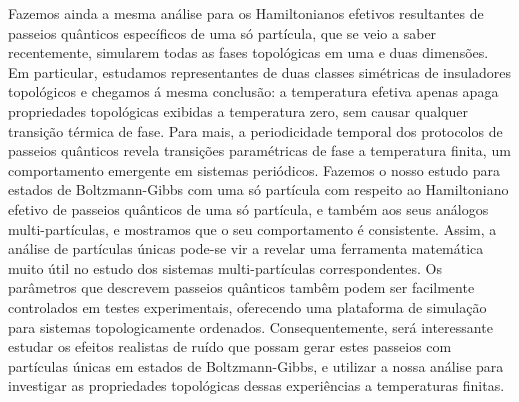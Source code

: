 \documentclass[11pt]{report}
\begin{document}
Fazemos ainda a mesma an\'{a}lise para os Hamiltonianos efetivos resultantes de passeios qu\^{a}nticos espec\'{i}ficos de uma s\'{o} part\'{i}cula, que se veio a saber recentemente, simularem todas as fases topol\'{o}gicas em uma e duas dimens\~{o}es. Em particular, estudamos representantes de duas classes sim\'{e}tricas de insuladores topol\'{o}gicos e chegamos \'{a} mesma conclus\~{a}o: a temperatura efetiva apenas apaga propriedades topol\'{o}gicas exibidas a temperatura zero, sem causar qualquer transi\c{c}\~{a}o t\'{e}rmica de fase. Para mais, a periodicidade temporal dos protocolos de passeios qu\^{a}nticos revela transi\c{c}\~{o}es param\'{e}tricas de fase a temperatura finita, um comportamento emergente em sistemas peri\'{o}dicos. Fazemos o nosso estudo para estados de Boltzmann-Gibbs com uma s\'{o} part\'{i}cula com respeito ao Hamiltoniano efetivo de passeios qu\^{a}nticos de uma s\'{o} part\'{i}cula, e tamb\'{e}m aos seus an\'{a}logos multi-part\'{i}culas, e mostramos que o seu comportamento \'{e} consistente. Assim, a an\'{a}lise de part\'{i}culas \'{u}nicas pode-se vir a revelar uma ferramenta matem\'{a}tica muito \'{u}til no estudo dos sistemas multi-part\'{i}culas correspondentes. Os par\^{a}metros que descrevem passeios qu\^{a}nticos tamb\^{e}m podem ser facilmente controlados em testes experimentais, oferecendo uma plataforma de simula\c{c}\~{a}o para sistemas topologicamente ordenados. Consequentemente, ser\'{a} interessante estudar os efeitos realistas de ru\'{i}do que possam gerar estes passeios com part\'{i}culas \'{u}nicas em estados de Boltzmann-Gibbs, e utilizar a nossa an\'{a}lise para investigar as propriedades topol\'{o}gicas dessas experi\^{e}ncias a temperaturas finitas.
\end{document}
